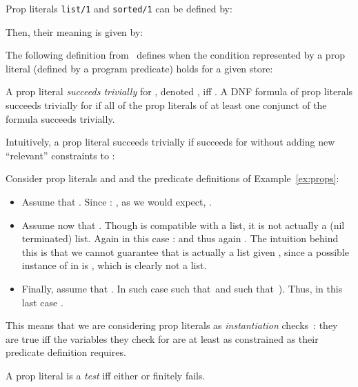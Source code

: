 \documentclass{llncs}
\newcommand{\skbd}[1]{\mbox{\tt\small{#1}}}
\begin{document}
\begin{example}
  \label{ex:props}
  Prop literals \skbd{list/1} and \skbd{sorted/1} can be defined by:
    
  Then, their meaning is given by:
  
\end{example}

The following definition from~\cite{assrt-theoret-framework-lopstr99}
defines when the condition represented by a prop literal (defined by a
program predicate) holds for a given store:

\begin{definition}
  \label{def:succeeds-triv}
  A prop literal  \emph{succeeds trivially} for , denoted
  , iff .
A DNF formula of prop literals succeeds trivially for  if
  all of the prop literals of at least one conjunct of the formula
  succeeds trivially.
\end{definition}

Intuitively, a prop literal  succeeds trivially if  succeeds for
 without adding new ``relevant'' constraints to :

\begin{example} 
\label{ex:props-more}
  Consider prop literals  and  and the predicate
  definitions of Example~\ref{ex:props}:
\vspace{-0.75em}
  \begin{itemize}
  \item
  Assume that .
  Since  : ,
  as we would expect, .
  
  \item
  Assume now that .  Though  is
  compatible with a list, it is not actually a (nil terminated)
  list. Again in this case  :  and thus again . The intuition behind this is that we cannot guarantee that
   is actually a list given , since a possible instance of
   in  is , which is clearly not a
  list.
  
  \item
  Finally, assume that .  In such case
   such that\  and  such that\ ).  Thus, in
  this last case .
  \end{itemize}
\end{example}

This means that we are considering prop literals as
\emph{instantiation}
checks~\cite{prog-glob-an,assert-lang-disciplbook-short}: they are
true iff the variables they check for are at least as constrained as
their predicate definition requires.

\begin{definition}
\label{def:test-literal}
  A prop literal  is a \emph{test} iff  either
   or  finitely fails.
\end{definition}
\end{document}
